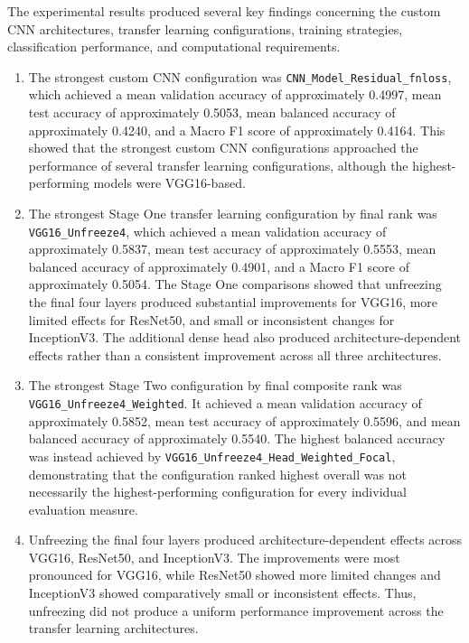 \documentclass[12pt, a4paper]{report}
\begin{document}
			The experimental results produced several key findings concerning the custom CNN architectures, transfer learning configurations, training strategies, classification performance, and computational requirements.
			\begin{enumerate}
				\item The strongest custom CNN configuration was \texttt{CNN\_Model\_Residual\_fnloss}, which achieved a mean validation accuracy of approximately 0.4997, mean test accuracy of approximately 0.5053, mean balanced accuracy of approximately 0.4240, and a Macro F1 score of approximately 0.4164. This showed that the strongest custom CNN configurations approached the performance of several transfer learning configurations, although the highest-performing models were VGG16-based.\\
				\item The strongest Stage One transfer learning configuration by final rank was \texttt{VGG16\_Unfreeze4}, which achieved a mean validation accuracy of approximately 0.5837, mean test accuracy of approximately 0.5553, mean balanced accuracy of approximately 0.4901, and a Macro F1 score of approximately 0.5054. The Stage One comparisons showed that unfreezing the final four layers produced substantial improvements for VGG16, more limited effects for ResNet50, and small or inconsistent changes for InceptionV3. The additional dense head also produced architecture-dependent effects rather than a consistent improvement across all three architectures.\\
				\item The strongest Stage Two configuration by final composite rank was \\\texttt{VGG16\_Unfreeze4\_Weighted}. It achieved a mean validation accuracy of approximately 0.5852, mean test accuracy of approximately 0.5596, and mean balanced accuracy of approximately 0.5540. The highest balanced accuracy was instead achieved by \texttt{VGG16\_Unfreeze4\_Head\_Weighted\_Focal}, demonstrating that the configuration ranked highest overall was not necessarily the highest-performing configuration for every individual evaluation measure.
				\item Unfreezing the final four layers produced architecture-dependent effects across VGG16, ResNet50, and InceptionV3. The improvements were most pronounced for VGG16, while ResNet50 showed more limited changes and InceptionV3 showed comparatively small or inconsistent effects. Thus, unfreezing did not produce a uniform performance improvement across the transfer learning architectures.\\

\end{enumerate}
\end{document}
